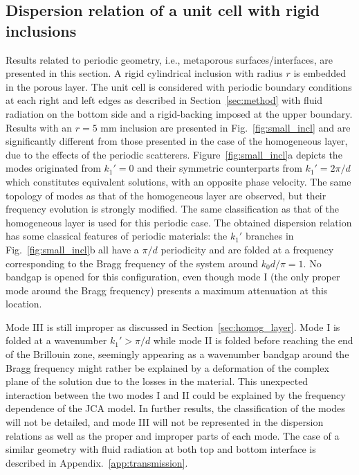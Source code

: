 \subsection{Dispersion relation of a unit cell with rigid inclusions}
\label{ssec:rigid_incl}
Results related to periodic geometry, i.e., metaporous surfaces/interfaces, are presented in this section. A rigid cylindrical inclusion with radius $r$ is embedded in the porous layer. The unit cell is considered with periodic boundary conditions at each right and left edges as described in Section~\ref{sec:method} with fluid radiation on the bottom side and a rigid-backing imposed at the upper boundary. Results with an $r=5$ mm inclusion are presented in Fig.~\ref{fig:small_incl} and are significantly different from those presented in the case of the homogeneous layer, due to the effects of the periodic scatterers. Figure~\ref{fig:small_incl}a depicts the modes originated from $k_1' = 0$ and their symmetric counterparts from $k_1' = 2\pi/d$ which constitutes equivalent solutions, with an opposite phase velocity. The same topology of modes as that of the homogeneous layer are observed, but their frequency evolution is strongly modified. The same classification as that of the homogeneous layer is used for this periodic case. The obtained dispersion relation has some classical features of periodic materials: the $k_1'$ branches in Fig.~\ref{fig:small_incl}b all have a $\pi/d$ periodicity and are folded at a frequency corresponding to the Bragg frequency of the system around $k_0 d/ \pi = 1$. No bandgap is opened for this configuration, even though mode I (the only proper mode around the Bragg frequency) presents a maximum attenuation at this location. 

Mode III is still improper as discussed in Section~\ref{sec:homog_layer}. Mode I is folded at a wavenumber $k_1' > \pi/d$ while mode II is folded before reaching the end of the Brillouin zone, seemingly appearing as a wavenumber bandgap around the Bragg frequency might rather be explained by a deformation of the complex plane of the solution due to the losses in the material. This unexpected interaction between the two modes I and II could be explained by the frequency dependence of the JCA model. In further results, the classification of the modes will not be detailed, and mode III will not be represented in the dispersion relations as well as the proper and improper parts of each mode. The case of a similar geometry with fluid radiation at both top and bottom interface is described in Appendix.~\ref{app:transmission}.

